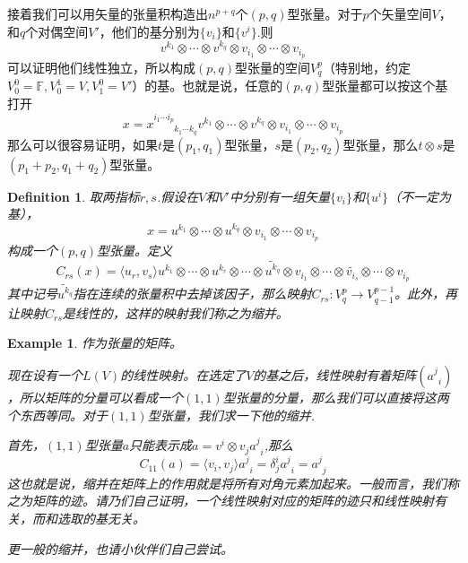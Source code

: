 \documentclass[11pt,a4paper,openany]{book}%
\theoremstyle{plain}%
\newtheorem{defi}{Definition}[chapter]%
\newtheorem{exa}{Example}[chapter]%
\begin{document}
接着我们可以用矢量的张量积构造出$n^{p+q}$个$(p,q)$型张量。对于$p$个矢量空间$V$，和$q$个对偶空间$V'$，他们的基分别为$\{v_i\}$和$\{v^i\}$.则
\[
v^{k_1}\otimes\cdots\otimes v^{k_q}\otimes v_{i_1}\otimes\cdots\otimes v_{i_p}
\]
可以证明他们线性独立，所以构成$(p,q)$型张量的空间$V^p_q$（特别地，约定$V^0_0=\mathbb{F},V^1_0=V,V^0_1=V'$）的基。也就是说，任意的$(p,q)$型张量都可以按这个基打开
\[
x=x^{i_1\cdots i_p}_{\,\,\,\,\,\,\,\,\,\,\,\,\,\,k_1\cdots k_q}v^{k_1}\otimes\cdots\otimes v^{k_q}\otimes v_{i_1}\otimes\cdots\otimes v_{i_p}
\]
那么可以很容易证明，如果$t$是$(p_1,q_1)$型张量，$s$是$(p_2,q_2)$型张量，那么$t\otimes s$是$(p_1+p_2,q_1+q_2)$型张量。
\begin{defi}
取两指标$r,s$.假设在$V$和$V'$中分别有一组矢量$\{v_i\}$和$\{u^i\}$（不一定为基），
\[
x=u^{k_1}\otimes\cdots\otimes u^{k_q}\otimes v_{i_1}\otimes\cdots\otimes v_{i_p}
\]
构成一个$(p,q)$型张量。定义
\[
C_{rs}(x)=\langle u_r,v_s \rangle u^{k_1}\otimes\cdots\otimes u^{k_r}\otimes\cdots\otimes \widetilde{u^{k_q}}\otimes v_{i_1}\otimes\cdots\otimes \widetilde{v_{i_s}}\otimes\cdots\otimes v_{i_p}
\]
其中记号$\widetilde{u^{k_q}}$指在连续的张量积中去掉该因子，那么映射$C_{rs}:V^p_q\rightarrow V^{p-1}_{q-1}$。此外，再让映射$C_{rs}$是线性的，这样的映射我们称之为缩并。
\end{defi}
\begin{exa}
作为张量的矩阵。

现在设有一个$L(V)$的线性映射。在选定了$V$的基之后，线性映射有着矩阵$(a^j_{\,\,\,i})$，所以矩阵的分量可以看成一个$(1,1)$型张量的分量，那么我们可以直接将这两个东西等同。对于$(1,1)$型张量，我们求一下他的缩并.

首先，$(1,1)$型张量$a$只能表示成$a=v^i\otimes v_j a^j_{\,\,\,i}$,那么
\[
C_{11}(a)=\langle v_i,v_j\rangle a^j_{\,\,\,i}=\delta_{j}^i a^j_{\,\,\,i}=a^j_{\,\,\,j}
\]
这也就是说，缩并在矩阵上的作用就是将所有对角元素加起来。一般而言，我们称之为矩阵的{\kaishu 迹}。请乃们自己证明，一个线性映射对应的矩阵的迹只和线性映射有关，而和选取的基无关。

更一般的缩并，也请小伙伴们自己尝试。
\end{exa}
\end{document}
